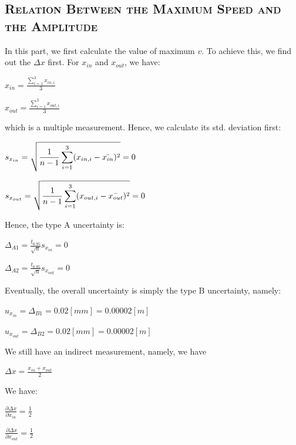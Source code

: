 \documentclass[a4paper,12pt]{article}
\begin{document}
\begin{appendices}
\subsection{\textsc{Relation Between the Maximum Speed and the Amplitude}}
In this part, we first calculate the value of maximum $v$. To achieve this, we find out the $\Delta x$ first. For $x_{in}$ and $x_{out}$, we have:
\begin{center}
$\displaystyle x_{in} = \frac{\sum_{i=1}^3x_{in,i}}{3}$
\end{center}
\begin{center}
$\displaystyle x_{out} = \frac{\sum_{i=1}^3x_{out,i}}{3}$
\end{center}
which is a multiple measurement. Hence, we calculate its std. deviation first:
\begin{center}
$\displaystyle s_{x_{in}} = \sqrt{\frac{1}{n-1}\sum_{i=1}^3(x_{in,i}-\long\bar{x_{in}})^2} = 0$
\end{center}
\begin{center}
$\displaystyle s_{x_{out}} = \sqrt{\frac{1}{n-1}\sum_{i=1}^3(x_{out,i}-\long\bar{x_{out}})^2} = 0$
\end{center}
Hence, the type A uncertainty is:
\begin{center}
$\displaystyle \Delta_{A1} = \frac{t_{0.95}}{\sqrt{n}}s_{x_{in}} = 0 $
\end{center}
\begin{center}
$\displaystyle \Delta_{A2} = \frac{t_{0.95}}{\sqrt{n}}s_{x_{out}} = 0 $
\end{center}
\par Eventually, the overall uncertainty is simply the type B uncertainty, namely:
\begin{center}
$\displaystyle u_{x_{in}} = \Delta_{B1} = 0.02 [mm] = 0.00002 [m] $
\end{center}
\begin{center}
$\displaystyle u_{x_{out}} = \Delta_{B2} = 0.02 [mm] = 0.00002 [m] $
\end{center}
\par We still have an indirect measurement, namely, we have
\begin{center}
$\displaystyle \Delta x = \frac{x_{in} + x_{out}}{2}$
\end{center}
We have:
\begin{center}
$\displaystyle \frac{\partial \Delta x}{\partial x_{in}} = \frac{1}{2}$
\end{center}
\begin{center}
$\displaystyle \frac{\partial \Delta x}{\partial x_{out}} = \frac{1}{2}$

\end{center}
\end{appendices}
\end{document}
